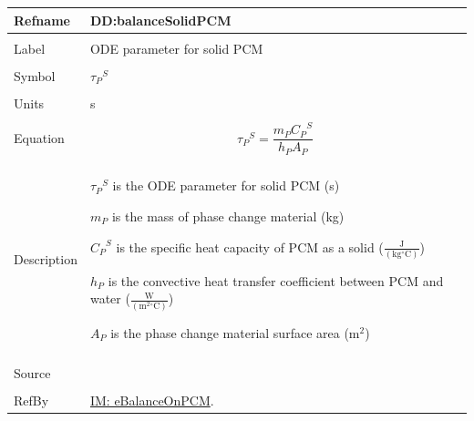 \documentclass[12pt]{article}
\begin{document}
\noindent \begin{minipage}{\textwidth}
\begin{tabular}{p{} p{}}
\toprule \textbf{Refname} & \textbf{DD:balanceSolidPCM}
\label{DD:balanceSolidPCM}
\\ \midrule \\
Label & ODE parameter for solid PCM
\\ \midrule \\
Symbol & ${{τ_{P}}^{S}}$
\\ \midrule \\
Units & s
\\ \midrule \\
Equation & \begin{displaymath}
           {{τ_{P}}^{S}}=\frac{{m_{P}} {{C_{P}}^{S}}}{{h_{P}} {A_{P}}}
           \end{displaymath}
\\ \midrule \\
Description & \begin{symbDescription}
              \item{${{τ_{P}}^{S}}$ is the ODE parameter for solid PCM (s)}
              \item{${m_{P}}$ is the mass of phase change material (kg)}
              \item{${{C_{P}}^{S}}$ is the specific heat capacity of PCM as a solid ($\frac{\text{J}}{(\text{kg}{}^{\circ}\text{C})}$)}
              \item{${h_{P}}$ is the convective heat transfer coefficient between PCM and water ($\frac{\text{W}}{(\text{m}^{2}{}^{\circ}\text{C})}$)}
              \item{${A_{P}}$ is the phase change material surface area ($\text{m}^{2}$)}
              \end{symbDescription}
\\ \midrule \\
Source & \cite{lightstone2012}
\\ \midrule \\
RefBy & \hyperref[IM:eBalanceOnPCM]{IM: eBalanceOnPCM}.
\\ \bottomrule \end{tabular}
\end{minipage}
\par~
\end{document}
